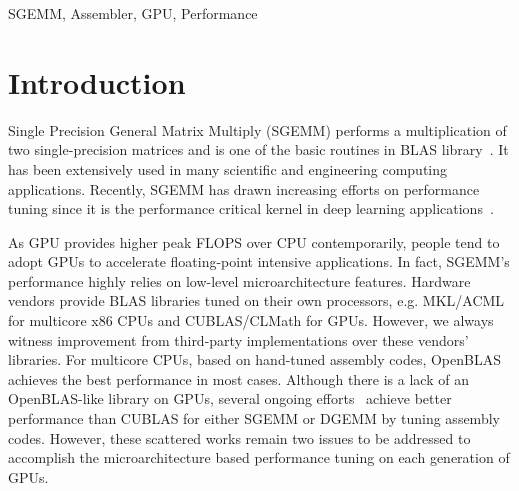 \documentclass{sig-alternate-05-2015}
\begin{document}
\keywords
SGEMM, Assembler, GPU, Performance

\section{Introduction}
Single Precision General Matrix Multiply (SGEMM) performs a multiplication of two single-precision matrices and is one of the basic routines in BLAS library~\cite{}. It has been extensively used in many scientific and engineering computing applications. Recently, SGEMM has drawn increasing efforts on performance tuning since it is the performance critical kernel in deep learning applications~\cite{}.

As GPU provides higher peak FLOPS over CPU contemporarily, people tend to adopt GPUs to accelerate floating-point intensive applications. In fact, SGEMM's performance highly relies on low-level microarchitecture features. Hardware vendors provide BLAS libraries tuned on their own processors, e.g. MKL/ACML for multicore x86 CPUs and CUBLAS/CLMath for GPUs. However, we always witness improvement from third-party implementations over these vendors' libraries. For multicore CPUs, based on hand-tuned assembly codes, OpenBLAS~\cite{} achieves the best performance in most cases. Although there is a lack of an OpenBLAS-like library on GPUs, several ongoing efforts~\cite{} achieve better performance than CUBLAS for either SGEMM or DGEMM by tuning assembly codes. However, these scattered works remain two issues to be addressed to accomplish the microarchitecture based performance tuning on each generation of GPUs.
\end{document}
